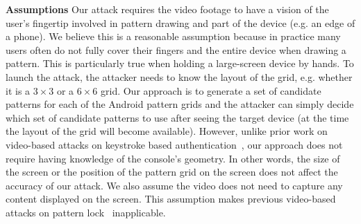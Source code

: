         \noindent \textbf{Assumptions}
        Our attack requires the video footage to have a vision of the user's
        fingertip involved in pattern drawing and part of the device (e.g. an edge of a phone).
        We believe this is a reasonable assumption because in practice many users often do not fully cover their fingers and the entire device when drawing a pattern.
        This is particularly true when holding a large-screen device by hands.
        To launch the
        attack, the attacker needs to know the layout of the grid, e.g. whether it is
        a $3 \times 3$ or a $6 \times 6$ grid. Our approach is to generate a set of
        candidate patterns for each of the Android pattern grids and the attacker can simply decide
        which set of candidate patterns to use after seeing the target device (at the time the
        layout of the grid will become available). However, unlike prior work on
        video-based attacks on keystroke based authentication~\cite{shukla2014beware}, our approach does not
        require having knowledge of the console's geometry. In other words, the size
        of the screen or the position of the pattern grid  on the screen does not
        affect the accuracy of our attack. We also assume the video does not need to
        capture any content displayed on the screen. This assumption makes previous
        video-based attacks on pattern lock~\cite{aviv2010smudge} inapplicable.
